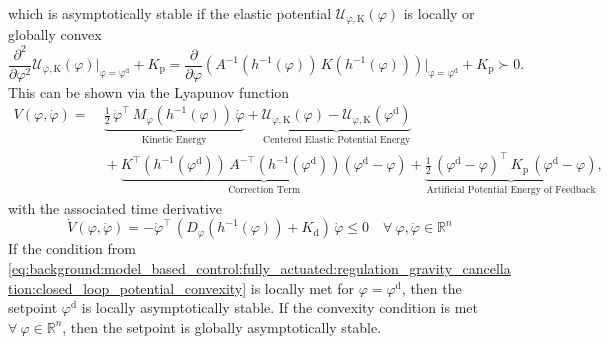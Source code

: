 which is asymptotically stable if the elastic potential $\mathcal{U}_{\varphi,\mathrm{K}}(\varphi)$ is locally or globally convex
\begin{equation}\label{eq:background:model_based_control:fully_actuated:regulation_gravity_cancellation:closed_loop_potential_convexity}
    \frac{\partial^2}{\partial \varphi^2} \mathcal{U}_{\varphi,\mathrm{K}}(\varphi) \bigg |_\mathrm{\varphi = \varphi^\mathrm{d}} + K_\mathrm{p} = \frac{\partial}{\partial \varphi} \left (  A^{-1}(h^{-1}(\varphi)) \,  K(h^{-1}(\varphi)) \right ) \bigg |_\mathrm{\varphi = \varphi^\mathrm{d}} + K_\mathrm{p} \succ 0.
\end{equation}
This can be shown via the Lyapunov function~\citep{khalil2002nonlinear, della2020model, della2023model}
\begin{equation}
\begin{split}
    V(\varphi, \dot{\varphi}) =& \: \underbrace{\frac{1}{2} \, \dot{\varphi}^\top \, M_\varphi(h^{-1}(\varphi)) \, \dot{\varphi}}_\text{Kinetic Energy} + \underbrace{\mathcal{U}_{\varphi,\mathrm{K}}(\varphi) - \mathcal{U}_{\varphi,\mathrm{K}}(\varphi^\mathrm{d})}_\text{Centered Elastic Potential Energy}\\
    & \: + \underbrace{K^\top(h^{-1}(\varphi^\mathrm{d})) \, A^{-\top}(h^{-1}(\varphi^\mathrm{d})) \left ( \varphi^\mathrm{d} - \varphi \right )}_\text{Correction Term} + \underbrace{\frac{1}{2} \, (\varphi^\mathrm{d} - \varphi)^\top \, K_\mathrm{p} \, (\varphi^\mathrm{d} - \varphi)}_\text{Artificial Potential Energy of Feedback},
\end{split}
\end{equation}
with the associated time derivative~\citep{della2023model}
\begin{equation}
    \dot{V}(\varphi, \dot{\varphi}) = -\dot{\varphi}^\top \, \left ( D_\varphi(h^{-1}(\varphi)) + K_\mathrm{d} \right ) \, \dot{\varphi} \leq 0 \quad \forall \: \varphi,\dot{\varphi} \in \mathbb{R}^n
\end{equation}
If the condition from \eqref{eq:background:model_based_control:fully_actuated:regulation_gravity_cancellation:closed_loop_potential_convexity} is locally met for $\varphi = \varphi^\mathrm{d}$, then the setpoint $\varphi^\mathrm{d}$ is locally asymptotically stable. If the convexity condition is met $\forall \: \varphi \in \mathbb{R}^n$, then the setpoint is globally asymptotically stable.

